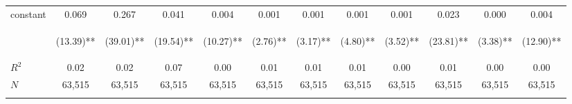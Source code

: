 \begin{tabular}{lccccccccccc}
\noalign{\smallskip}constant & 0.069 & 0.267 & 0.041 & 0.004 & 0.001 & 0.001 & 0.001 & 0.001 & 0.023 & 0.000 & 0.004\\
 & \begin{footnotesize}(13.39)**\end{footnotesize} & \begin{footnotesize}(39.01)**\end{footnotesize} & \begin{footnotesize}(19.54)**\end{footnotesize} & \begin{footnotesize}(10.27)**\end{footnotesize} & \begin{footnotesize}(2.76)**\end{footnotesize} & \begin{footnotesize}(3.17)**\end{footnotesize} & \begin{footnotesize}(4.80)**\end{footnotesize} & \begin{footnotesize}(3.52)**\end{footnotesize} & \begin{footnotesize}(23.81)**\end{footnotesize} & \begin{footnotesize}(3.38)**\end{footnotesize} & \begin{footnotesize}(12.90)**\end{footnotesize}\\
\noalign{\smallskip}$R^2$ & 0.02 & 0.02 & 0.07 & 0.00 & 0.01 & 0.01 & 0.01 & 0.00 & 0.01 & 0.00 & 0.00\\
$N$ & 63,515 & 63,515 & 63,515 & 63,515 & 63,515 & 63,515 & 63,515 & 63,515 & 63,515 & 63,515 & 63,515\\
\noalign{\smallskip}\hline\hline\end{tabular}

